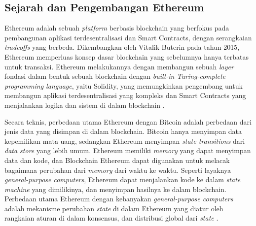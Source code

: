 \subsection{Sejarah dan Pengembangan Ethereum}
\label{subsec:sejarah-pengembangan-ethereum}

Ethereum adalah sebuah \textit{platform} berbasis blockchain yang berfokus pada pembangunan aplikasi terdesentralisasi dan Smart Contracts, dengan serangkaian \textit{tradeoffs} yang berbeda.
Dikembangkan oleh Vitalik Buterin pada tahun 2015, Ethereum memperluas konsep dasar blockchain yang sebelumnya hanya terbatas untuk transaksi. Ethereum melakukannya dengan membangun sebuah \textit{layer} fondasi dalam bentuk sebuah blockchain dengan \textit{built-in Turing-complete programming language}, yaitu Solidity, yang memungkinkan pengembang untuk membangun aplikasi terdesentralisasi yang kompleks dan Smart Contracts yang menjalankan logika dan sistem di dalam blockchain \parencite{buterin2013ethereum}.

Secara teknis, perbedaan utama Ethereum dengan Bitcoin adalah perbedaan dari jenis data yang disimpan di dalam blockchain. Bitcoin hanya menyimpan data kepemilikan mata uang, sedangkan Ethereum menyimpan \textit{state transitions} dari \textit{data store} yang lebih umum. Ethereum memiliki \textit{memory} yang dapat menyimpan data dan kode, dan Blockchain Ethereum dapat digunakan untuk melacak bagaimana perubahan dari \textit{memory} dari waktu ke waktu. Seperti layaknya \textit{general-purpose computers}, Ethereum dapat menjalankan kode ke dalam \textit{state machine} yang dimilikinya, dan menyimpan hasilnya ke dalam blockchain. Perbedaan utama Ethereum dengan kebanyakan \textit{general-purpose computers} adalah mekanisme perubahan \textit{state} di dalam Ethereum yang diatur oleh rangkaian aturan di dalam konsensus, dan distribusi global dari \textit{state} \parencite{antonopoulos2018mastering}.



